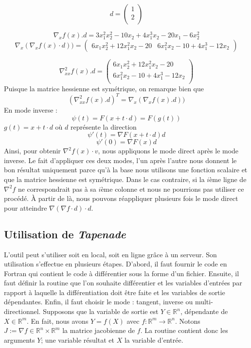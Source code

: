 $$d = \left( \begin{array}{c} 1 \\2 \\ \end{array} \right)$$

$$\nabla_xf(x).d=3x_1^2x_2^2-10x_2+4x_1^3x_2-20x_1-6x_2^2$$
$$\nabla_x(\nabla_x f(x) \cdot d))=
\left( \begin{array}{cc} 6x_1x_2^2+12x_1^2x_2-20 & 6x_1^2x_2-10+4x_1^3-12x_2 \end{array} \right) $$ 

$$\nabla_{xx}^2f(x).d =
 \left( \begin{array}{c} 6x_1x_2^2+12x_1^2x_2-20\\6x_1^2x_2-10+4x_1^3-12x_2 \\ \end{array} \right) $$
%
%
Puisque la matrice hessienne est sym\'etrique, on remarque bien que 
$$\left( \nabla_{xx}^2f(x).d \right)^T = \nabla_x(\nabla_xf(x).d))$$
%
%
En mode inverse :
$$\psi(t)=F(x+t \cdot d)=F(g(t))$$
$g(t)=x+t \cdot d$ o\`u $d$ repr\'esente la direction
$$\psi'(t)=\nabla F(x+t \cdot d)d$$
$$\psi'(0)=\nabla F(x)d$$
%
Ainsi, pour obtenir $\nabla^2 f(x)\cdot v$, nous appliquons le mode direct apr\`es le mode inverse.
Le fait d'appliquer ces deux modes, l'un apr\`es l'autre nous donnent le bon r\'esultat uniquement parce qu'\`a la base
nous utilisons une fonction scalaire et que la matrice hessienne est sym\'etrique. Dans le cas contraire, si la $i$\`eme ligne de $\nabla^2 f$ 
ne correspondrait pas \`a sa $i$\`eme colonne et nous ne pourrions pas utiliser ce proc\'ed\'e. \`A partir de l\`a, nous pouvons r\'eappliquer plusieurs fois 
le mode direct pour atteindre $\nabla (\nabla f \cdot d)\cdot d$.



    \subsection{Utilisation de {\it Tapenade}}

L'outil peut s'utiliser soit en local, soit en ligne grâce \`a un serveur. Son utilisation s'effectue en plusieurs \'etapes.
D'abord, il faut fournir le code en Fortran qui contient le code \`a diff\'erentier sous la forme d'un fichier. Ensuite,
il faut d\'efinir la routine que l'on souhaite diff\'erentier et les variables d'entr\'ees par rapport \`a laquelle la diff\'erentiation doit
être faite et les variables de sortie d\'ependantes. Enfin, il faut choisir le mode : tangent, inverse ou multi-directionnel.
Supposons que la variable de sortie est $Y \in \mathbb{R}^n$, d\'ependante de $X \in \mathbb{R}^m$. En fait, nous avons $Y=f(X)$ avec
$f:\mathbb{R}^m\rightarrow\mathbb{R}^n$. Notons $J:=\nabla f \in \mathbb{R}^n\times\mathbb{R}^m$ la matrice jacobienne de $f$.
La routine contient donc les arguments $Y$; une variable r\'esultat et $X$ la variable d'entr\'ee.


